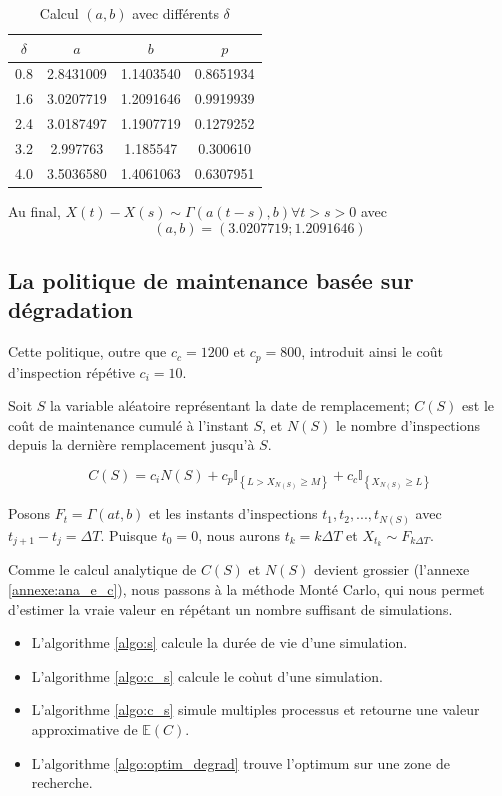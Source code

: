 \documentclass[10pt,a4paper]{article}
\begin{document}
\begin{table}[!h]
    \centering
    \begin{tabular}{|c|c|c|c|}
        \hline
        $\delta$ & $a$ & $b$ & $p$ \\
        \hline
        0.8 & 2.8431009 & 1.1403540 & 0.8651934\\
        1.6 & 3.0207719 & 1.2091646 & 0.9919939\\
        2.4 & 3.0187497 & 1.1907719 & 0.1279252\\
        3.2 & 2.997763 & 1.185547 & 0.300610\\
        4.0 & 3.5036580 & 1.4061063 & 0.6307951\\
        \hline
    \end{tabular}
    \caption{Calcul $(a,b)$ avec différents $\delta$}
\end{table}

Au final, $X(t) - X(s) \sim \Gamma(a(t-s),b) \forall t > s > 0$ avec $$(a,b) = (3.0207719;1.2091646)$$

\subsection{La politique de maintenance basée sur dégradation}

Cette politique, outre que $c_c=1200$ et $c_p=800$, introduit ainsi le coût d'inspection répétive $c_i = 10$.

Soit $S$ la variable aléatoire représentant la date de remplacement; $C(S)$ est le coût de maintenance cumulé à l’instant $S$, et $N(S)$ le nombre d'inspections depuis la dernière remplacement jusqu'à $S$.

\begin{equation}
    \label{c_s_de}
    C\left( S \right) = {c_i}N\left( S \right) + {c_p}{\mathbb{I}_{\left\{ {L > {X_{N\left( S \right)}} \geq M} \right\}}} + {c_c}{\mathbb{I}_{\left\{ {{X_{N\left( S \right)}} \geq L} \right\}}}
\end{equation}

Posons ${F_t} = \Gamma \left( {at,b} \right)$ et les instants d'inspections ${t_1},{t_2},...,{t_{N\left( S \right)}}$ avec ${t_{j + 1}} - {t_j} = \Delta T$. Puisque $t_0 = 0$, nous aurons ${t_k} = k\Delta T$ et $X_{t_k} \sim F_{k\Delta T}$.

Comme le calcul analytique de $C(S)$ et $N(S)$ devient grossier (l'annexe \eqref{annexe:ana_e_c}), nous passons à la méthode Monté Carlo, qui nous permet d'estimer la vraie valeur en répétant un nombre suffisant de simulations.
\begin{itemize}
    \item L'algorithme \eqref{algo:s} calcule la durée de vie d'une simulation.
    \item L'algorithme \eqref{algo:c_s} calcule le coùut d'une simulation.
    \item L'algorithme \eqref{algo:c_s} simule multiples processus et retourne une valeur approximative de $\mathbb{E}(C)$.
    \item L'algorithme \eqref{algo:optim_degrad} trouve l'optimum sur une zone de recherche.
\end{itemize}
\end{document}
